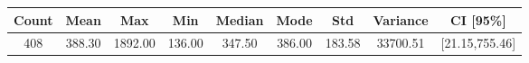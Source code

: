 \begin{tabular}{|c|c|c|c|c|c|c|c|c|}\hline
\rowcolor{Plum!20}
Count&Mean&Max&Min&Median&Mode&Std&Variance&CI [95\%]\\\hline\hline
408&388.30&1892.00&136.00&347.50&386.00&183.58&33700.51&[21.15,755.46]\\\hline
\end{tabular}
